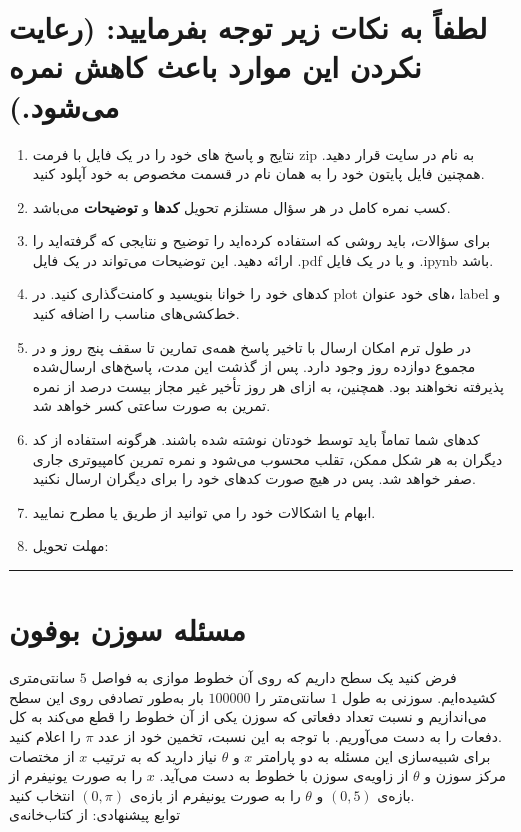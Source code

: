 \documentclass[a4paper]{article}
\begin{document}
\section*{
لطفاً به نکات زیر توجه بفرمایید: (رعایت نکردن این موارد باعث کاهش نمره می‌شود.)
}
\begin{enumerate}
	\item 
نتایج و پاسخ های خود را در یک فایل با فرمت zip به نام
 در سایت  
\href{https://quera.org/overview/add_to_course/course/10631}{} 
 قرار دهید. همچنین فایل پایتون خود را به همان نام در قسمت مخصوص به خود آپلود کنید.
	\item 
کسب نمره کامل در هر سؤال مستلزم تحویل  \textbf{کدها} و \textbf{توضیحات} می‌باشد. 
\item 
برای سؤالات، باید روشی که استفاده کرده‌اید را توضیح  و نتایجی که گرفته‌اید را ارائه دهید. این توضیحات می‌تواند در یک فایل  .pdf  و یا در یک فایل  .ipynb باشد. 
\item 
کدهای خود را خوانا بنویسید و کامنت‌‌گذاری کنید. در plot های خود عنوان، label و خط‌کشی‌های مناسب را اضافه کنید.
\item
در طول ترم امکان ارسال با تاخیر پاسخ  همه‌ی تمارین تا سقف پنج روز و در مجموع دوازده روز وجود دارد. پس از گذشت این مدت، پاسخ‌های ارسال‌شده پذیرفته نخواهند بود. همچنین، به ازای هر روز تأخیر غیر مجاز  بیست درصد از نمره تمرین به صورت ساعتی کسر خواهد شد.
\item 
کدهای شما تماماً باید توسط خودتان نوشته شده باشند. هرگونه استفاده از کد دیگران به هر شکل ممکن، تقلب محسوب می‌شود و نمره تمرین کامپیوتری جاری صفر خواهد شد. پس در هیچ صورت کدهای خود را برای دیگران ارسال نکنید.
\item 
ابهام يا اشكالات خود را مي توانيد  از طریق
\href{mailto:smmzdr@gmail.com}{}
یا 
\href{mailto:javadiamirhosein.2000@gmail.com}{}
مطرح نماييد.
\item 
مهلت تحویل:  
\end{enumerate}
\rule[0.1\baselineskip]{\textwidth}{1.5pt}

\clearpage
\section{مسئله سوزن بوفون}
فرض کنید یک سطح داریم که روی آن خطوط موازی به فواصل $ 5 $ سانتی‌متری کشیده‌ایم. سوزنی به طول $ 1 $ سانتی‌متر را $ 100000 $ بار به‌طور تصادفی روی این سطح می‌اندازیم و 
نسبت تعداد دفعاتی که سوزن یکی از آن خطوط را قطع می‌کند به کل دفعات را به دست می‌آوریم. با توجه به این نسبت، تخمین خود از عدد 
$ \pi $
را اعلام کنید. 
\\
برای شبیه‌سازی این مسئله به دو پارامتر $ x $ و $ \theta $ نیاز دارید که به ترتیب $ x $ از مختصات مرکز سوزن و $ \theta $ از زاویه‌ی سوزن با خطوط به دست می‌آید. $ x $ را به صورت یونیفرم از بازه‌ی
 $ (0,5) $
 و $ \theta $ را به صورت یونیفرم از بازه‌ی 
 $ (0,\pi) $
 انتخاب ‌کنید.
\\
توابع پیشنهادی:
از کتاب‌خانه‌ی 
\end{document}
